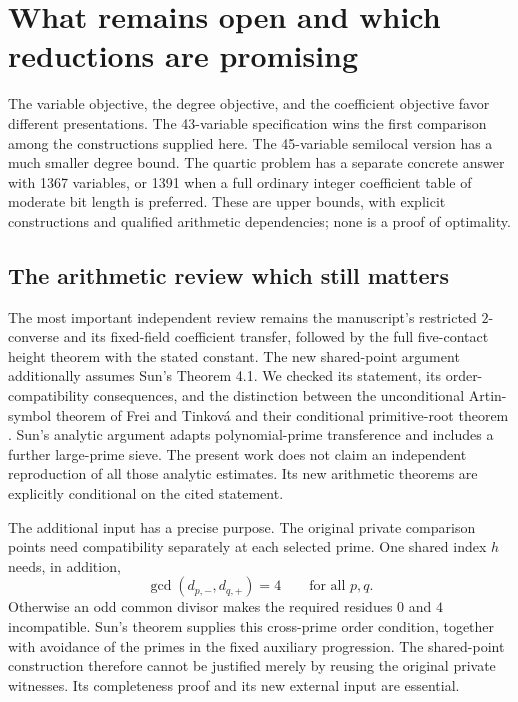 \section{What remains open and which reductions are promising}
\label{sec:strategy}

The variable objective, the degree objective, and the coefficient objective
favor different presentations. The 43-variable specification wins the
first comparison among the constructions supplied here. The 45-variable
semilocal version has a much smaller degree bound. The quartic problem
has a separate concrete answer with 1367 variables, or 1391 when a full
ordinary integer coefficient table of moderate bit length is preferred.
These are upper bounds, with explicit constructions and qualified
arithmetic dependencies; none is a proof of optimality.

\subsection{The arithmetic review which still matters}

The most important independent review remains the manuscript's restricted
$2$-converse and its fixed-field coefficient transfer, followed by the
full five-contact height theorem with the stated constant. The new
shared-point argument additionally assumes Sun's Theorem 4.1. We checked
its statement, its order-compatibility consequences, and the distinction
between the unconditional Artin-symbol theorem of Frei and Tinkov\'a
and their conditional primitive-root theorem
\cite{FreiTinkova2025}. Sun's analytic argument adapts polynomial-prime
transference \cite{TaoZiegler2018} and includes a further large-prime
sieve. The present work does not claim an independent reproduction of
all those analytic estimates. Its new arithmetic theorems are explicitly
conditional on the cited statement.

The additional input has a precise purpose. The original private
comparison points need compatibility separately at each selected prime.
One shared index $h$ needs, in addition,
\[
             \gcd(d_{p,-},d_{q,+})=4\qquad\text{for all }p,q.
\]
Otherwise an odd common divisor makes the required residues $0$ and $4$
incompatible. Sun's theorem supplies this cross-prime order condition,
together with avoidance of the primes in the fixed auxiliary progression.
The shared-point construction therefore cannot be justified merely by
reusing the original private witnesses. Its completeness proof and its
new external input are essential.

